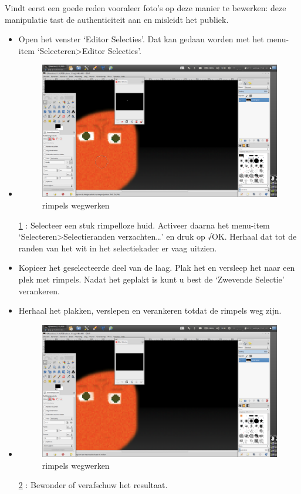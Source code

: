 \documentclass[11pt,a5paper,twoside]{book}
\begin{document}
   Vindt eerst een goede reden vooraleer foto’s op deze manier te bewerken:
    deze manipulatie tast de authenticiteit aan en misleidt het publiek.
   \begin{itemize}
    \item[1.]
     Open het venster ‘Editor Selecties’. Dat kan gedaan worden met
      het menu-item ‘Selecteren>Editor Selecties’.
    \item[2.]
     \begin{figure}
      \includegraphics[width=0.9\linewidth]{rimpels/2.png}
      \caption{rimpels wegwerken}
      \label{gx:rimpels/2}
     \end{figure}\ref{gx:rimpels/2}%
      : Selecteer een stuk rimpelloze huid. Activeer daarna het
      menu-item ‘Selecteren>Selectieranden verzachten…’ en druk
      op √OK. Herhaal dat tot de randen van het wit in het
      selectiekader er vaag uitzien.
    \item[3.] Kopieer het geselecteerde
      deel van de laag.
     Plak het en versleep het naar een
      plek met rimpels. Nadat het geplakt is kunt u best
      de ‘Zwevende Selectie’ verankeren.
    \item[4.]
     Herhaal het plakken, verslepen en verankeren totdat de
      rimpels weg zijn.
    \item[5.]
     \begin{figure}
      \includegraphics[width=0.90\linewidth]{rimpels/3.png}
      \caption{rimpels wegwerken}
      \label{gx:rimpels/3}%
     \end{figure}\ref{gx:rimpels/3}%
      : Bewonder of verafschuw het resultaat.
   \end{itemize}
\end{document}
